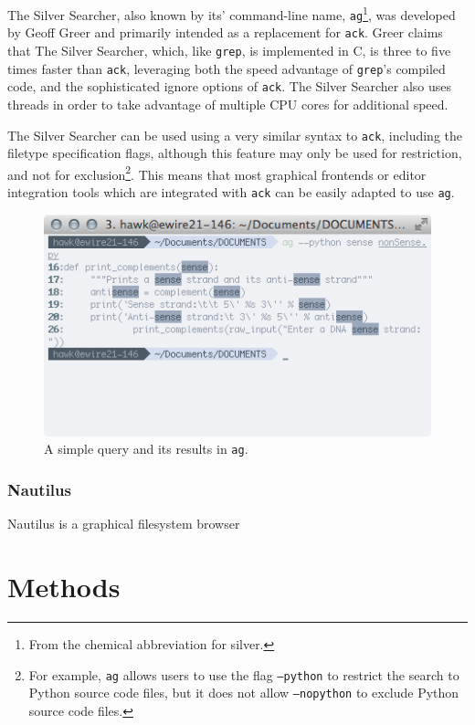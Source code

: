 \documentclass[12pt,letterpaper]{article}
\begin{document}
				The Silver Searcher, also known by its' command-line name, \texttt{ag}\footnote{From the chemical abbreviation for silver.}, was developed by Geoff Greer and primarily intended as a replacement for \texttt{ack}. Greer claims that The Silver Searcher, which, like \texttt{grep}, is implemented in C, is three to five times faster than \texttt{ack}, leveraging both the speed advantage of \texttt{grep}'s compiled code, and the sophisticated ignore options of \texttt{ack}. The Silver Searcher also uses threads in order to take advantage of multiple CPU cores for additional speed. 

				The Silver Searcher can be used using a very similar syntax to \texttt{ack}, including the filetype specification flags, although this feature may only be used for restriction, and not for exclusion\footnote{For example, \texttt{ag} allows users to use the flag \texttt{--python} to restrict the search to Python source code files, but it does not allow \texttt{--nopython} to exclude Python source code files.}. This means that most graphical frontends or editor integration tools which are integrated with \texttt{ack} can be easily adapted to use \texttt{ag}.

				\begin{figure}[H]
					\centering
					\includegraphics[resolution=72, scale = 0.75]{Figures/ag.png}
					\caption{A simple query and its results in \texttt{ag}.}
					\label{fig:ag}
				\end{figure}

			\subsubsection{Nautilus}

				Nautilus is a graphical filesystem browser

	\section{Methods}
\end{document}

